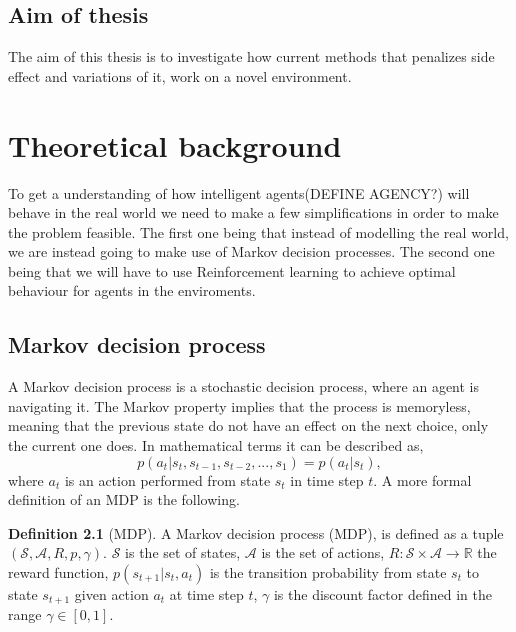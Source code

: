 \documentclass[12pt,A4]{report}
\theoremstyle{definition}
\newtheorem{definition}{Definition}[section]
\begin{document}
\section{Aim of thesis}
The aim of this thesis is to investigate how current methods that penalizes side effect and variations of it, work on a novel environment.











\chapter{Theoretical background}
To get a understanding of how intelligent agents(DEFINE AGENCY?) will behave in the real world we need to make a few simplifications in order to make the problem feasible. The first one being that instead of modelling the real world, we are instead going to make use of Markov decision processes. The second one being that we will have to use Reinforcement learning to achieve optimal behaviour for agents in the enviroments. 

\section{Markov decision process}
A Markov decision process is a stochastic decision process, where an agent is navigating it. The Markov property implies that the process is memoryless, meaning that the previous state do not have an effect on the next choice, only the current one does. In mathematical terms it can be described as,
\[ p(a_t|s_t, s_{t-1}, s_{t-2}, ... , s_1) = p(a_t|s_t),\]
where $a_t$ is an action performed from state $s_t$ in time step $t$. A more formal definition of an MDP is the following. 
\begin{definition}[MDP]
    A Markov decision process (MDP), is defined as a tuple $(\mathcal{S}, \mathcal{A}, R, p, \gamma)$. $\mathcal{S}$ is the set of states, $\mathcal{A}$ is the set of actions, $R: \mathcal{S} \times \mathcal{A} \rightarrow \mathbb{R}$ the reward function, $p(s_{t+1}|s_t, a_t)$ is the transition probability from state $s_t$ to state $s_{t+1}$ given action $a_t$ at time step $t$, $\gamma$ is the discount factor defined in the range $\gamma \in [0, 1]$.
\end{definition}
\end{document}
